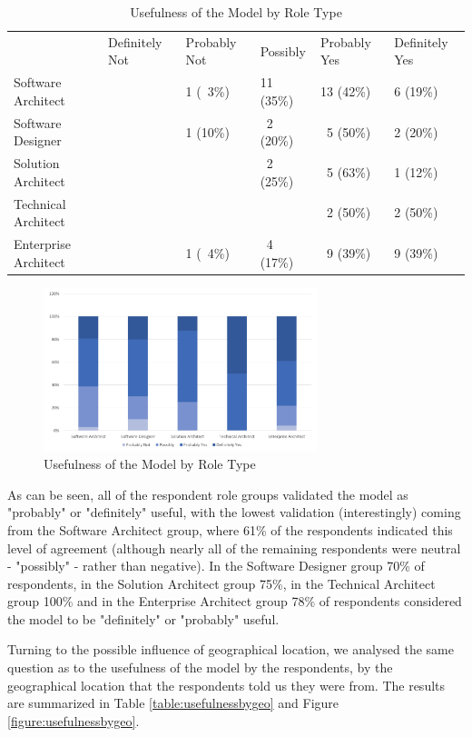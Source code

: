\begin{table}
\caption{Usefulness of the Model by Role Type}
\label{table:usefulnessbyrole}
\footnotesize
\begin{tabular}{l P{1.5cm} P{1.5cm} P{1.5cm} P{1.5cm} P{1.5cm}}
 & Definitely Not & Probably Not & Possibly & Probably Yes & Definitely Yes \\
Software Architect	 &  &  1 (~3\%) & 11 (35\%)  & 13 (42\%) & 6 (19\%) \\
Software Designer    &  &  1 (10\%) &  ~2 (20\%) & ~5 (50\%) & 2 (20\%) \\
Solution Architect   &  &           &  ~2 (25\%) & ~5 (63\%) & 1 (12\%) \\
Technical Architect	 &  &           &            & ~2 (50\%) & 2 (50\%) \\
Enterprise Architect &  & 1 (~4\%)  & ~4 (17\%)  & ~9 (39\%) & 9 (39\%) \\
\end{tabular}
\end{table}

\begin{figure}[h]
\centering
\includegraphics[width=8cm,trim={2 2 2 2},clip]{Figures/prioritisation-usefulness-by-role}
\caption{Usefulness of the Model by Role Type}
\label{figure:usefulnessbyrole}
\end{figure}

As can be seen, all of the respondent role groups validated the model as "probably" or "definitely" useful, with the lowest validation (interestingly) coming from the Software Architect group, where 61\% of the respondents indicated this level of agreement (although nearly all of the remaining respondents were neutral - "possibly" - rather than negative).  In the Software Designer group 70\% of respondents, in the Solution Architect group 75\%, in the Technical Architect group 100\% and in the Enterprise Architect group 78\% of respondents considered the model to be "definitely" or "probably" useful.

Turning to the possible influence of geographical location, we analysed the same question as to the usefulness of the model by the respondents, by the geographical location that the respondents told us they were from.  The results are summarized in Table \ref{table:usefulnessbygeo} and Figure \ref{figure:usefulnessbygeo}.

